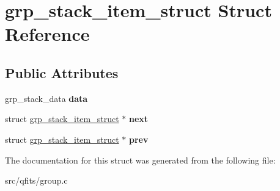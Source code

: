\hypertarget{structgrp__stack__item__struct}{}\section{grp\+\_\+stack\+\_\+item\+\_\+struct Struct Reference}
\label{structgrp__stack__item__struct}
\subsection*{Public Attributes}
\begin{DoxyCompactItemize}
\item 
\mbox{\label{structgrp__stack__item__struct_adf0356cd6c7631a6f72fc99d8b18af25}} 
grp\+\_\+stack\+\_\+data {\bfseries data}
\item 
\mbox{\label{structgrp__stack__item__struct_ac727c0e208ef40dc924877fe1c78a4b9}} 
struct \hyperlink{structgrp__stack__item__struct}{grp\+\_\+stack\+\_\+item\+\_\+struct} $\ast$ {\bfseries next}
\item 
\mbox{\label{structgrp__stack__item__struct_affcfc374e00630722ab8ef99a66e9d74}} 
struct \hyperlink{structgrp__stack__item__struct}{grp\+\_\+stack\+\_\+item\+\_\+struct} $\ast$ {\bfseries prev}
\end{DoxyCompactItemize}


The documentation for this struct was generated from the following file\+:\begin{DoxyCompactItemize}
\item 
src/qfits/group.\+c\end{DoxyCompactItemize}
